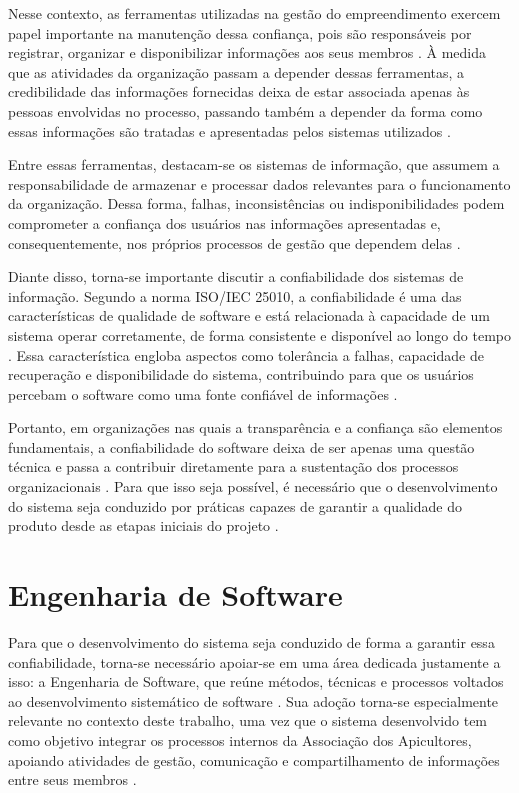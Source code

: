 Nesse contexto, as ferramentas utilizadas na gestão do empreendimento exercem papel importante na manutenção dessa confiança, pois são responsáveis por registrar, organizar e disponibilizar informações aos seus membros \cite{aguiar2026}. À medida que as atividades da organização passam a depender dessas ferramentas, a credibilidade das informações fornecidas deixa de estar associada apenas às pessoas envolvidas no processo, passando também a depender da forma como essas informações são tratadas e apresentadas pelos sistemas utilizados \cite{pereira2025}.

Entre essas ferramentas, destacam-se os sistemas de informação, que assumem a responsabilidade de armazenar e processar dados relevantes para o funcionamento da organização. Dessa forma, falhas, inconsistências ou indisponibilidades podem comprometer a confiança dos usuários nas informações apresentadas e, consequentemente, nos próprios processos de gestão que dependem delas \cite{muller2024adopting}.

Diante disso, torna-se importante discutir a confiabilidade dos sistemas de informação. Segundo a norma ISO/IEC 25010, a confiabilidade é uma das características de qualidade de software e está relacionada à capacidade de um sistema operar corretamente, de forma consistente e disponível ao longo do tempo \cite{iso25010}. Essa característica engloba aspectos como tolerância a falhas, capacidade de recuperação e disponibilidade do sistema, contribuindo para que os usuários percebam o software como uma fonte confiável de informações \cite{muller2024adopting}.

Portanto, em organizações nas quais a transparência e a confiança são elementos fundamentais, a confiabilidade do software deixa de ser apenas uma questão técnica e passa a contribuir diretamente para a sustentação dos processos organizacionais \cite{aguiar2026, aprova2025}. Para que isso seja possível, é necessário que o desenvolvimento do sistema seja conduzido por práticas capazes de garantir a qualidade do produto desde as etapas iniciais do projeto \cite{sommerville2019}.

\section{Engenharia de Software} \label{sec:engenharia_software}
 
Para que o desenvolvimento do sistema seja conduzido de forma a garantir essa confiabilidade, torna-se necessário apoiar-se em uma área dedicada justamente a isso: a Engenharia de Software, que reúne métodos, técnicas e processos voltados ao desenvolvimento sistemático de software \cite{sommerville2019}. Sua adoção torna-se especialmente relevante no contexto deste trabalho, uma vez que o sistema desenvolvido tem como objetivo integrar os processos internos da Associação dos Apicultores, apoiando atividades de gestão, comunicação e compartilhamento de informações entre seus membros \cite{aguiar2026}.
 
